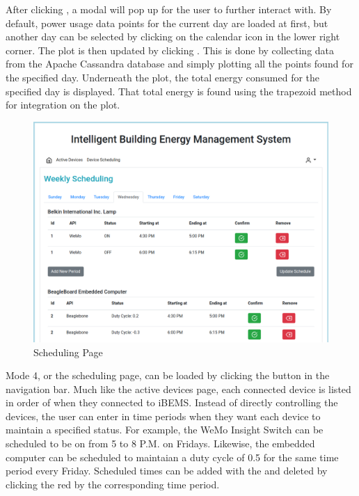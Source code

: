After clicking , a modal will pop up for the user to further
interact with. By default, power usage data points for the current day are
loaded at first, but another day can be selected by clicking on the calendar
icon in the lower right corner. The plot is then updated by clicking . This is done by collecting data from the Apache Cassandra database and
simply plotting all the points found for the specified day. Underneath the plot,
the total energy consumed for the specified day is displayed. That total energy
is found using the trapezoid method for integration on the plot. %
%
\begin{figure}
    \centering
    \includegraphics[scale=0.35]{figs/Applications_screen.png}
    \caption{Scheduling Page}
    \label{fig:schedulingl}
\end{figure}
%

Mode 4, or the scheduling page, can be loaded by clicking the  button in the navigation bar. Much like the active devices page,
each connected device is listed in order of when they connected to iBEMS.
Instead of directly controlling the devices, the user can enter in time periods
when they want each device to maintain a specified status. For example, the WeMo
Insight Switch can be scheduled to be on from 5 to 8 P.M. on Fridays. Likewise,
the embedded computer can be scheduled to maintaian a duty cycle of 0.5 for the
same time period every Friday. Scheduled times can be added with the  and deleted by clicking the red  by the corresponding time period.

